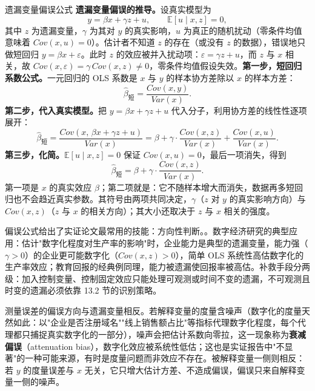 \begin{derivation}{遗漏变量偏误公式}{}
\textbf{遗漏变量偏误的推导。}设真实模型为
\[
y = \beta x + \gamma z + u, \qquad \mathbb{E}[u \mid x, z] = 0,
\]
其中 $z$ 为遗漏变量，$\gamma$ 为其对 $y$ 的真实影响，$u$ 为真正的随机扰动（零条件均值意味着 $Cov(x,u) = 0$）。估计者不知道 $z$ 的存在（或没有 $z$ 的数据），错误地只做短回归 $y = \beta x + \varepsilon$。此时 $z$ 的效应被并入扰动项：$\varepsilon = \gamma z + u$，而 $z$ 与 $x$ 相关，故 $Cov(x, \varepsilon) = \gamma\, Cov(x, z) \neq 0$，零条件均值假设失效。\textbf{第一步，短回归系数公式。}一元回归的 OLS 系数是 $x$ 与 $y$ 的样本协方差除以 $x$ 的样本方差：
\[
\hat\beta_{\text{短}} = \frac{Cov(x, y)}{Var(x)}.
\]
\textbf{第二步，代入真实模型。}把 $y = \beta x + \gamma z + u$ 代入分子，利用协方差的线性性逐项展开：
\[
\hat\beta_{\text{短}}
= \frac{Cov(x,\, \beta x + \gamma z + u)}{Var(x)}
= \beta + \gamma \cdot \frac{Cov(x, z)}{Var(x)} + \frac{Cov(x, u)}{Var(x)}.
\]
\textbf{第三步，化简。}$\mathbb{E}[u \mid x,z] = 0$ 保证 $Cov(x,u) = 0$，最后一项消失，得到
\[
\hat\beta_{\text{短}} = \beta + \gamma \cdot \frac{Cov(x, z)}{Var(x)}.
\]
第一项是 $x$ 的真实效应 $\beta$；第二项就是：它不随样本增大而消失，数据再多短回归也不会趋近真实参数。其符号由两项共同决定，$\gamma$（$z$ 对 $y$ 的真实影响方向）与 $Cov(x,z)$（$z$ 与 $x$ 的相关方向）；其大小还取决于 $z$ 与 $x$ 相关的强度。
\end{derivation}

偏误公式给出了实证论文最常用的技能：方向性判断。。数字经济研究的典型应用：估计"数字化程度对生产率的影响"时，企业能力是典型的遗漏变量，能力强（$\gamma > 0$）的企业更可能数字化（$Cov(x,z) > 0$），简单 OLS 系统性高估数字化的生产率效应；教育回报的经典例同理，能力被遗漏使回报率被高估。补救手段分两级：加入控制变量、控制固定效应只能处理可观测或时间不变的遗漏，不可观测且时变的遗漏必须依靠 13.2 节的识别策略。

测量误差的偏误方向与遗漏变量相反。若解释变量的度量含噪声（数字化的度量天然如此：以"企业是否注册域名""线上销售额占比"等指标代理数字化程度，每个代理都只捕捉真实数字化的一部分），噪声会把估计系数向零拉，这一现象称为\textbf{衰减偏误}（attenuation bias），数字化效应被系统性低估；这也是实证报告中"不显著"的一种可能来源，有时是度量问题而非效应不存在。被解释变量一侧则相反：若 $y$ 的度量误差与 $x$ 无关，它只增大估计方差、不造成偏误，偏误只来自解释变量一侧的噪声。

